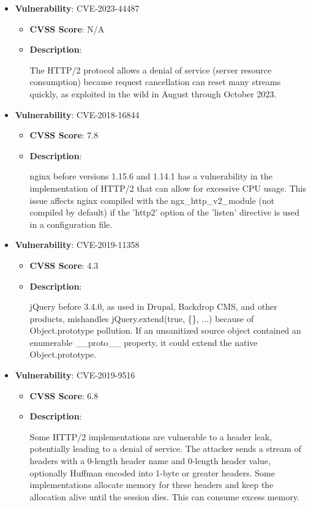 \documentclass{article}
\begin{document}
\begin{itemize}
        \item \textbf{Vulnerability}: CVE-2023-44487
        \begin{itemize}
            \item \textbf{CVSS Score}:  N/A 
            \item \textbf{Description}:
            \parbox[t]{0.9\linewidth}{
                \ttfamily The HTTP/2 protocol allows a denial of service (server resource consumption) because request cancellation can reset many streams quickly, as exploited in the wild in August through October 2023.
            }
        \end{itemize}
    
        \item \textbf{Vulnerability}: CVE-2018-16844
        \begin{itemize}
            \item \textbf{CVSS Score}:  7.8 
            \item \textbf{Description}:
            \parbox[t]{0.9\linewidth}{
                \ttfamily nginx before versions 1.15.6 and 1.14.1 has a vulnerability in the implementation of HTTP/2 that can allow for excessive CPU usage. This issue affects nginx compiled with the ngx\_http\_v2\_module (not compiled by default) if the 'http2' option of the 'listen' directive is used in a configuration file.
            }
        \end{itemize}
    
        \item \textbf{Vulnerability}: CVE-2019-11358
        \begin{itemize}
            \item \textbf{CVSS Score}:  4.3 
            \item \textbf{Description}:
            \parbox[t]{0.9\linewidth}{
                \ttfamily jQuery before 3.4.0, as used in Drupal, Backdrop CMS, and other products, mishandles jQuery.extend(true, \{\}, ...) because of Object.prototype pollution. If an unsanitized source object contained an enumerable \_\_proto\_\_ property, it could extend the native Object.prototype.
            }
        \end{itemize}
    
        \item \textbf{Vulnerability}: CVE-2019-9516
        \begin{itemize}
            \item \textbf{CVSS Score}:  6.8 
            \item \textbf{Description}:
            \parbox[t]{0.9\linewidth}{
                \ttfamily Some HTTP/2 implementations are vulnerable to a header leak, potentially leading to a denial of service. The attacker sends a stream of headers with a 0-length header name and 0-length header value, optionally Huffman encoded into 1-byte or greater headers. Some implementations allocate memory for these headers and keep the allocation alive until the session dies. This can consume excess memory.
            }
        \end{itemize}
    

\end{itemize}
\end{document}
